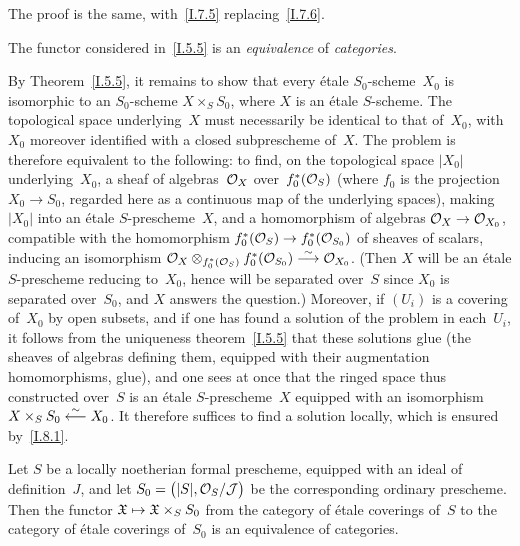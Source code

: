 The proof is the same, with~\ref{I.7.5} replacing~\ref{I.7.6}.

\begin{theorem}
\label{I.8.3}
The functor considered in~\ref{I.5.5} is an \emph{equivalence}
of \emph{categories}.
\end{theorem}

By Theorem~\ref{I.5.5}, it remains to show that every \'etale
$S_0$-scheme~$X_0$ is isomorphic to an $S_0$-scheme
$X\times_S S_0$, where $X$ is an \'etale $S$-scheme.
The topological space underlying~$X$ must necessarily be
identical to that of~$X_0$, with $X_0$ moreover identified
with a closed subprescheme of~$X$. The problem is therefore
equivalent to the following: to find, on the topological
space $|X_0|$ underlying~$X_0$, a sheaf of algebras~$\cal{O}_X$
over~$f_0^*(\cal{O}_S)$ (where $f_0$ is the projection
$X_0\to S_0$, regarded here as a continuous map of the
underlying spaces), making $|X_0|$ into an \'etale
$S$-prescheme~$X$, and a homomorphism of algebras
$\cal{O}_X\to\cal{O}_{X_0}$, compatible with the homomorphism
$f_0^*(\cal{O}_S)\to f_0^*(\cal{O}_{S_0})$ of sheaves of
scalars, inducing an isomorphism
$\cal{O}_X\otimes_{f_0^*(\cal{O}_S)}f_0^*(\cal{O}_{S_0})
\isomto\cal{O}_{X_0}$. (Then $X$ will be an \'etale
$S$-prescheme reducing to~$X_0$,
hence will be separated over~$S$ since $X_0$ is separated
over~$S_0$, and $X$ answers the question.) Moreover, if
$(U_i)$ is a covering of~$X_0$ by open subsets, and if one
has found a solution of the problem in each~$U_i$, it follows
from the uniqueness theorem~\ref{I.5.5} that these solutions
glue (\ie the sheaves of algebras defining them, equipped
with their augmentation homomorphisms, glue), and one sees
at once that the ringed space thus constructed over~$S$ is
an \'etale $S$-prescheme~$X$ equipped with an isomorphism
$X\times_S S_0\isomfrom X_0$. It therefore suffices to find
a solution locally, which is ensured by~\ref{I.8.1}.

\begin{corollary}
\label{I.8.4}
Let $S$ be a locally noetherian formal prescheme, equipped
with an ideal of definition~$J$, and let
$S_0=\big(|S|,\cal{O}_S/\cal{J}\big)$ be the corresponding
ordinary prescheme. Then the functor
$\goth{X}\mto\goth{X}\times_S S_0$ from the category of
\'etale coverings of~$S$ to the category of \'etale coverings
of~$S_0$ is an equivalence of categories.
\end{corollary}

